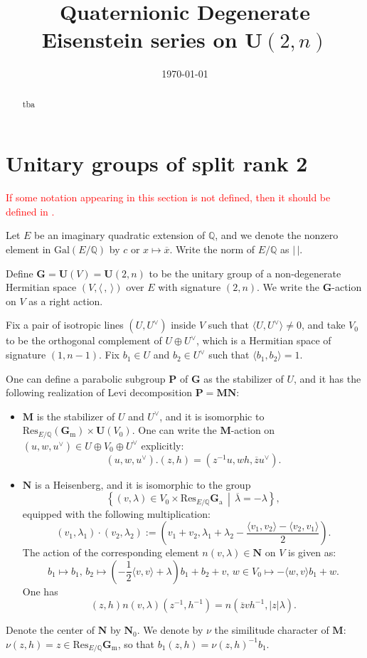 \documentclass[12pt]{article}
\theoremstyle{remark}
\theoremstyle{definition}
\newcommand{\Q}{\mathbb{Q}}
\newcommand{\lrangle}[2]{\langle #1,#2\rangle}
\newcommand{\rmm}[1]{\mathrm{#1}}
\newcommand{\bff}[1]{\mathbf{#1}}
\newcommand{\midline}{\,\middle\vert\,}
\newcommand{\set}[2]{\left\{#1\midline #2\right\}}
\begin{document}
\title{Quaternionic Degenerate Eisenstein series on \texorpdfstring{$\bff{U}(2,n)$}{}}
\author{}
\date{\today}
\maketitle
\begin{abstract}
    tba
\end{abstract}
\section{Unitary groups of split rank 2}
\label{section rank 2 unitary groups}
\textcolor{red}{
If some notation appearing in this section is not defined,
then it should be defined in \cite{Hilado_McGlade_Yan_Fourier_coefficients_unitary_group}.
}

Let $E$ be an imaginary quadratic extension of $\Q$,
and we denote the nonzero element in $\mathrm{Gal}(E/\Q)$ by $c$ or $x\mapsto \overline{x}$.
Write the norm of $E/\Q$ as $|\,|$.

Define $\bff{G}=\bff{U}(V)=\bff{U}(2,n)$ to be the unitary group of a non-degenerate Hermitian space $(V,\lrangle{\,}{\,})$ over $E$ with signature $(2,n)$.
We write the $\bff{G}$-action on $V$ as a right action.

Fix a pair of isotropic lines $(U,U^{\vee})$ inside $V$ such that $\lrangle{U}{U^{\vee}}\neq 0$,
and take $V_{0}$ to be the orthogonal complement of $U\oplus U^{\vee}$,
which is a Hermitian space of signature $(1,n-1)$.
Fix $b_{1}\in U$ and $b_{2}\in U^{\vee}$ such that $\lrangle{b_{1}}{b_{2}}=1$.

One can define a parabolic subgroup $\bff{P}$ of $\bff{G}$
as the stabilizer of $U$, 
and it has the following realization of Levi decomposition $\bff{P}=\bff{MN}$:
\begin{itemize}
    \item $\bff{M}$ is the stabilizer of $U$ and $U^{\vee}$, and it is isomorphic to $\rmm{Res}_{E/\Q}(\bff{G}_{\rmm{m}})\times\bff{U}(V_{0})$.
    One can write the $\bff{M}$-action on $(u,w,u^{\vee})\in U\oplus V_{0}\oplus U^{\vee}$ explicitly:
    \[(u,w,u^{\vee}).(z,h)=(z^{-1}u,wh,\overline{z}u^{\vee}).\]
    \item $\bff{N}$ is a Heisenberg, and it is isomorphic to the group 
    \[\set{(v,\lambda)\in V_{0}\times \rmm{Res}_{E/\Q}\bff{G}_{\rmm{a}}}{\overline{\lambda}=-\lambda},\]
    equipped with the following multiplication:
    \[(v_{1},\lambda_{1})\cdot(v_{2},\lambda_{2}):=\left(v_{1}+v_{2},\lambda_{1}+\lambda_{2}-\frac{\lrangle{v_{1}}{v_{2}}-\lrangle{v_{2}}{v_{1}}}{2}\right).\]
    The action of the corresponding element $n(v,\lambda)\in\bff{N}$ on $V$ is given as: 
    \[b_{1}\mapsto b_{1},\,b_{2}\mapsto (-\frac{1}{2}\lrangle{v}{v}+\lambda)b_{1}+b_{2}+v,\,w\in V_{0}\mapsto -\lrangle{w}{v}b_{1}+w.\]
    One has 
    \[(z,h)n(v,\lambda)(z^{-1},h^{-1})=n(\overline{z}vh^{-1},|z|\lambda).\]
\end{itemize}
Denote the center of $\bff{N}$ by $\bff{N}_{0}$.
We denote by $\nu$
the similitude character of $\bff{M}$: $\nu(z,h)=z\in \rmm{Res}_{E/\Q}\bff{G}_{\rmm{m}}$,
so that $b_{1}(z,h)=\nu(z,h)^{-1}b_{1}$.
\end{document}
